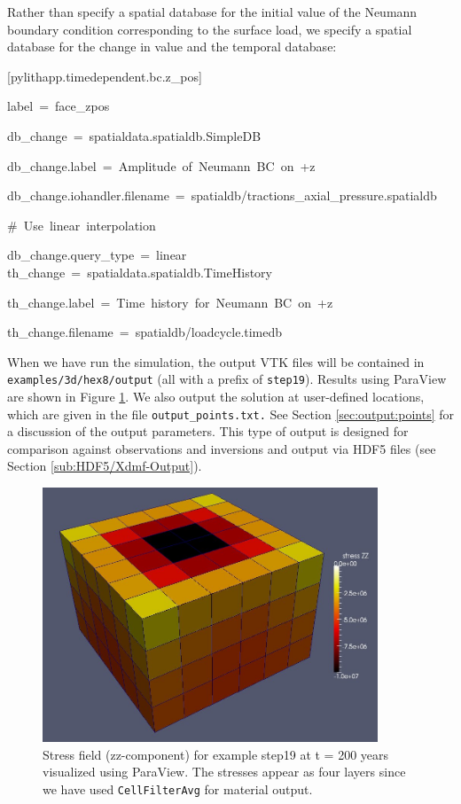 Rather than specify a spatial database for the initial value of the
Neumann boundary condition corresponding to the surface load, we specify
a spatial database for the change in value and the temporal database:
\begin{lyxcode}
{[}pylithapp.timedependent.bc.z\_pos{]}

label~=~face\_zpos

db\_change~=~spatialdata.spatialdb.SimpleDB

db\_change.label~=~Amplitude~of~Neumann~BC~on~+z

db\_change.iohandler.filename~=~spatialdb/tractions\_axial\_pressure.spatialdb

\#~Use~linear~interpolation

db\_change.query\_type~=~linear~\\


th\_change~=~spatialdata.spatialdb.TimeHistory

th\_change.label~=~Time~history~for~Neumann~BC~on~+z

th\_change.filename~=~spatialdb/loadcycle.timedb
\end{lyxcode}
When we have run the simulation, the output VTK files will be contained
in \texttt{examples/3d/hex8/output} (all with a prefix of \texttt{step19}).
Results using ParaView are shown in Figure \ref{fig:step19-stress-t200}.
We also output the solution at user-defined locations, which are given
in the file \texttt{output\_points.txt.} See Section \ref{sec:output:points}
for a discussion of the output parameters. This type of output is
designed for comparison against observations and inversions and output
via HDF5 files (see Section \ref{sub:HDF5/Xdmf-Output}).

\begin{figure}
\begin{centering}
\includegraphics[width=10cm]{tutorials/3dhex8/figs/step19-stress_t200}
\par\end{centering}

\caption{Stress field (zz-component) for example step19 at t = 200 years visualized
using ParaView. The stresses appear as four layers since we have used
\texttt{CellFilterAvg} for material output.\label{fig:step19-stress-t200}}
\end{figure}

